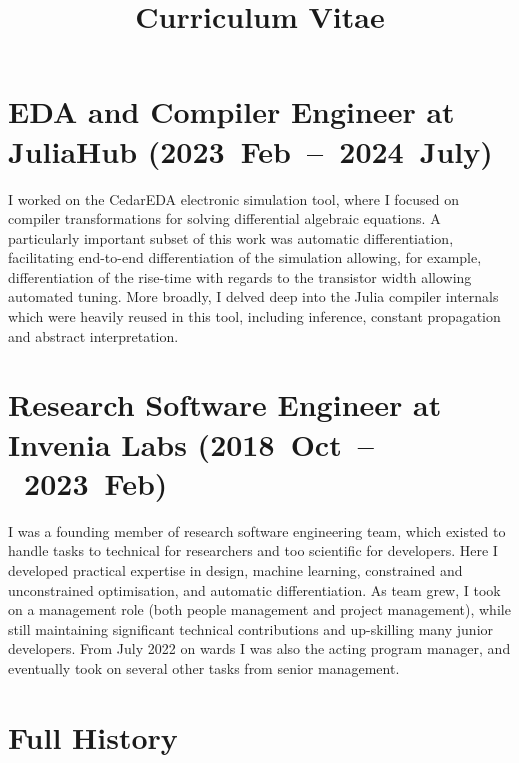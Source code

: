 \documentclass[11pt,a4paper,sans]{moderncv}
\title{Curriculum Vitae}
\begin{document}
\makecvtitle

\section{EDA and Compiler Engineer at JuliaHub (2023~Feb~--~2024~July)}
I worked on the CedarEDA electronic simulation tool, where I focused on compiler transformations for solving differential algebraic equations.
A particularly important subset of this work was automatic differentiation, facilitating end-to-end differentiation of the simulation allowing, for example, differentiation of the rise-time with regards to the transistor width allowing automated tuning.
More broadly, I delved deep into the Julia compiler internals which were heavily reused in this tool, including inference, constant propagation and abstract interpretation.


\section {Research Software Engineer at Invenia Labs (2018~Oct~--~2023~Feb)}
I was a founding member of research software engineering team, which existed to handle tasks to technical for researchers and too scientific for developers.
Here I developed practical expertise in design, machine learning, constrained and unconstrained optimisation, and automatic differentiation.
As team grew, I took on a management role (both people management and project management), while still maintaining significant technical contributions and up-skilling many junior developers.
From July 2022 on wards I was also the acting program manager, and eventually took on several other tasks from senior management.


\section{Full History}
\end{document}

